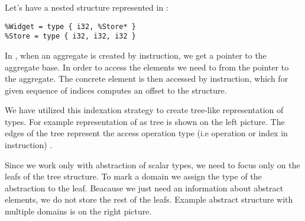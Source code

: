 \begin{example} \label{ex:fieldtrie}
Let's have a nested structure represented in \LLVMIR:
\begin{verbatim}
%Widget = type { i32, %Store* }
%Store = type { i32, i32, i32 }
\end{verbatim}
In \LLVM, when an aggregate is created by  instruction, we get
a pointer to the aggregate base. In order to access the elements we need to
 from the pointer to the aggregate. The concrete element is then
accessed by  instruction, which for given sequence of
indices computes an offset to the structure.

We have utilized this indexation strategy to create tree-like representation
of types. For example representation of  as tree is shown on the
left picture. The edges of the tree represent the access operation type
(i.e  operation or index in  instruction)
\cite{LLVM:langref}.

Since we work only with abstraction of scalar types, we need to focus only on
the leafs of the tree structure. To mark a domain we assign the type of the
abstraction to the leaf. Beacause we just need an information about abstract
elements, we do not store the rest of the leafs. Example abstract structure
with multiple domains is on the right picture.


\end{example}
